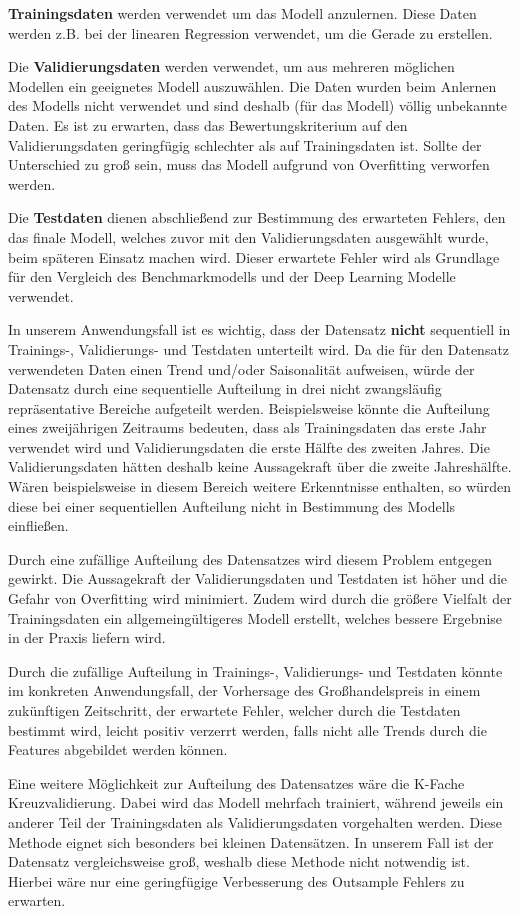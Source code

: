 \textbf{Trainingsdaten} werden verwendet um das Modell anzulernen. Diese Daten werden z.B. bei der linearen Regression verwendet, um die Gerade zu erstellen.

Die \textbf{Validierungsdaten} werden verwendet, um aus mehreren möglichen Modellen ein geeignetes Modell auszuwählen. Die Daten wurden beim Anlernen des Modells nicht verwendet und sind deshalb (für das Modell) völlig unbekannte Daten. Es ist zu erwarten, dass das Bewertungskriterium auf den Validierungsdaten geringfügig schlechter als auf Trainingsdaten ist. Sollte der Unterschied zu groß sein, muss das Modell aufgrund von Overfitting verworfen werden. 

Die \textbf{Testdaten} dienen abschließend zur Bestimmung des erwarteten Fehlers, den das finale Modell, welches zuvor mit den Validierungsdaten ausgewählt wurde, beim späteren Einsatz machen wird. Dieser erwartete Fehler wird als Grundlage für den Vergleich des Benchmarkmodells und der Deep Learning Modelle verwendet.

In unserem Anwendungsfall ist es wichtig, dass der Datensatz \textbf{nicht} sequentiell in Trainings-, Validierungs- und Testdaten unterteilt wird. Da die für den Datensatz verwendeten Daten einen Trend und/oder Saisonalität aufweisen, würde der Datensatz durch eine sequentielle Aufteilung in drei nicht zwangsläufig repräsentative Bereiche aufgeteilt werden. Beispielsweise könnte die Aufteilung eines zweijährigen Zeitraums bedeuten, dass als Trainingsdaten das erste Jahr verwendet wird und Validierungsdaten die erste Hälfte des zweiten Jahres. Die Validierungsdaten hätten deshalb keine Aussagekraft über die zweite Jahreshälfte. Wären beispielsweise in diesem Bereich weitere Erkenntnisse enthalten, so würden diese bei einer sequentiellen Aufteilung nicht in Bestimmung des Modells einfließen. 

Durch eine zufällige Aufteilung des Datensatzes wird diesem Problem entgegen gewirkt. Die Aussagekraft der Validierungsdaten und Testdaten ist höher und die Gefahr von Overfitting wird minimiert. Zudem wird durch die größere Vielfalt der Trainingsdaten ein allgemeingültigeres Modell erstellt, welches bessere Ergebnise in der Praxis liefern wird.

Durch die zufällige Aufteilung in Trainings-, Validierungs- und Testdaten könnte im konkreten Anwendungsfall, der Vorhersage des Großhandelspreis in einem zukünftigen Zeitschritt, der erwartete Fehler, welcher durch die Testdaten bestimmt wird, leicht positiv verzerrt werden, falls nicht alle Trends durch die Features abgebildet werden können.


Eine weitere Möglichkeit zur Aufteilung des Datensatzes wäre die K-Fache Kreuzvalidierung. Dabei wird das Modell mehrfach trainiert, während jeweils ein anderer Teil der Trainingsdaten als Validierungsdaten vorgehalten werden. Diese Methode eignet sich besonders bei kleinen Datensätzen. In unserem Fall ist der Datensatz vergleichsweise groß, weshalb diese Methode nicht notwendig ist. Hierbei wäre nur eine geringfügige Verbesserung des Outsample Fehlers zu erwarten.